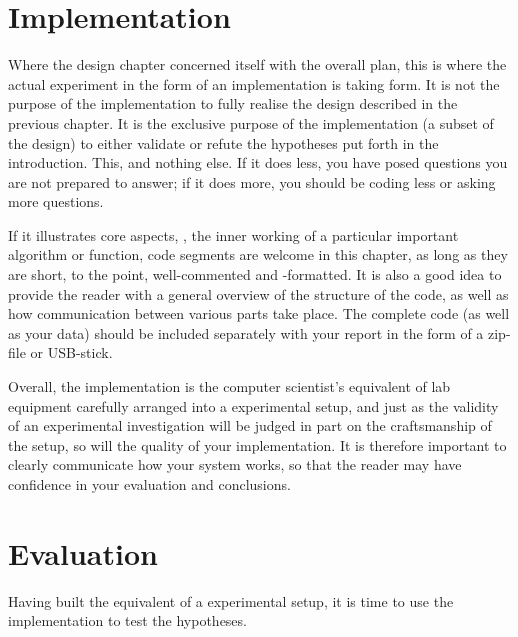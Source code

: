\documentclass[ twoside,openright,titlepage,numbers=noenddot,headinclude,%
                footinclude=true,cleardoublepage=empty,abstractoff, %
                BCOR=5mm,paper=a4,fontsize=11pt,%
                ngerman,american,%
                ]{scrreprt}
\begin{document}


\chapter{Implementation}
\label{cha:implementation}

Where the design chapter concerned itself with the overall plan, this
is where the actual experiment in the form of an implementation is
taking form.  It is not the purpose of the implementation to fully
realise the design described in the previous chapter. It is the
exclusive purpose of the implementation (a subset of the design) to
either validate or refute the hypotheses put forth in the
introduction. This, and nothing else. If it does less, you have posed
questions you are not prepared to answer; if it does more, you should
be coding less or asking more questions.

If it illustrates core aspects, \eg, the inner working of a particular
important algorithm or function, code segments are welcome in this
chapter, as long as they are short, to the point, well-commented and
-formatted.  It is also a good idea to provide the reader with a
general overview of the structure of the code, as well as how
communication between various parts take place.  The complete code (as
well as your data) should be included separately with your report in
the form of a zip-file or USB-stick.

Overall, the implementation is the computer scientist's equivalent of
lab equipment carefully arranged into a experimental setup, and just
as the validity of an experimental investigation will be judged in
part on the craftsmanship of the setup, so will the quality of your
implementation. It is therefore important to clearly communicate how
your system works, so that the reader may have confidence in your
evaluation and conclusions.


\chapter{Evaluation}
\label{cha:evaluation}

Having built the equivalent of a experimental setup, it is time to use
the implementation to test the hypotheses.
\end{document}
